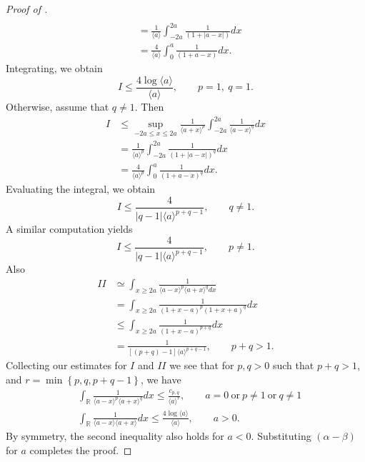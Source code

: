 \documentclass[12pt,reqno]{amsart}
\numberwithin{equation}{section}  %
\renewcommand{\cref}{\Cref}
\newcommand{\rr}{\mathbb{R}}
\begin{document}
\begin{proof}[Proof of \cref{lem:calc}]
\begin{equation*}
\begin{split}
  \\
  & = \frac{1}{\langle a \rangle} \int_{-2a}^{2a} \frac{1}{(1 + | a -
  x
  |)} d x
  \\
  & = \frac{4}{\langle a \rangle} \int_{0}^{a} \frac{1}{(1 + a -
  x)} d x.
\end{split}
\end{equation*}
%
%
Integrating, we obtain
%
%
\begin{equation*}
 I
 \le 
 \frac{4 \log \langle a \rangle}{\langle a \rangle}, \qquad p =1, \ q =1.
\end{equation*}
Otherwise, assume that $q \neq 1$. Then
\begin{equation*}
\begin{split}
  I
  & \le \sup_{-2a \le x \le 2a} \frac{1}{\langle a + x \rangle
  ^{p}} \int_{-2a}^{2a} \frac{1}{\langle a - x \rangle ^{q}} d x
  \\
  & = \frac{1}{\langle a \rangle ^{p}} \int_{-2a}^{2a} \frac{1}{(1 + | a -
  x
  |)^{q}} d x
  \\
  & = \frac{4}{\langle a \rangle ^{p}} \int_{0}^{a} \frac{1}{(1 + a -
  x)^{q}} d x.
\end{split}
\end{equation*}
Evaluating the integral, we obtain
\begin{equation*}
  I \le \frac{4}{|q-1| \langle a \rangle ^{p +q -1}}, \qquad q \neq 1.
\end{equation*}
%
%
A similar computation yields
\begin{equation*}
  I \le \frac{4}{|q-1| \langle a \rangle ^{p +q -1}}, \qquad p \neq 1.
\end{equation*}
%
%
Also
%
%
\begin{equation*}
\begin{split}
  II 
  & \simeq \int_{x \ge 2a} \frac{1}{\langle a - x \rangle ^{p} \langle a
  + x \rangle ^{q} d x}
  \\ 
  & = \int_{x \ge 2a} \frac{1}{(1 + x - a)^{p} (1 + x +
  a)^{q}} d x
  \\
  & \le \int_{x \ge 2a} \frac{1}{(1 + x -a)^{p+q}} d x
  \\
  & = \frac{1}{[(p + q)-1] \langle a \rangle ^{p+q -1}}, \qquad p + q > 1.
\end{split}
\end{equation*}
%
%
Collecting our estimates for $I$ and $II$ we see that for 
$p, q > 0$ such that $p +q >1$, and $r =\min\left\{p, q, p+q-1
 \right\}$, we have 
%
\begin{align*}
  & \int_{\rr} \frac{1}{\langle a - x \rangle ^{p} \langle a + x \rangle
  ^{q}} d x
  \le \frac{c_{p,q}}{\langle a \rangle ^{r}}, \qquad a = 0 \ \text{or} \
  p \neq 1 \ \text{or} \ q \neq 1
  \\
  & \int_{\rr} \frac{1}{\langle a - x \rangle  \langle a + x \rangle
} d x
  \le  \frac{4 \log \langle a \rangle}{\langle a \rangle}, \qquad a > 0.
  \label{est-2}
\end{align*}
By symmetry, the second inequality also holds for $a < 0$. Substituting $(\alpha -
\beta)$ for $a$ completes the proof.
\end{proof}
\end{document}
